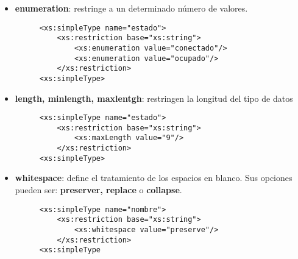 \begin{itemize}
    \item \textbf{enumeration}: restringe a un determinado número de valores.

    \begin{figure}[h]
        \begin{tcolorbox}[sharp corners, colback=yellow!30, colframe=white!20]
            \scriptsize
            \begin{verbatim}
<xs:simpleType name="estado">
    <xs:restriction base="xs:string">
        <xs:enumeration value="conectado"/>
        <xs:enumeration value="ocupado"/>
    </xs:restriction>
<xs:simpleType>
            \end{verbatim}
        \end{tcolorbox}
    \end{figure}

    \item \textbf{length, minlength, maxlentgh}: restringen la longitud del tipo de datos

    \begin{figure}[h]
        \begin{tcolorbox}[sharp corners, colback=yellow!30, colframe=white!20]
            \scriptsize
            \begin{verbatim}
<xs:simpleType name="estado">
    <xs:restriction base="xs:string">
        <xs:maxLength value="9"/>
    </xs:restriction>
<xs:simpleType>
            \end{verbatim}
        \end{tcolorbox}
    \end{figure}

    \item \textbf{whitespace}: define el tratamiento de los espacios en blanco. Sus opciones pueden ser: \textbf{preserver, replace} o \textbf{collapse}.

    \begin{figure}[h]
        \begin{tcolorbox}[sharp corners, colback=yellow!30, colframe=white!20]
            \scriptsize
            \begin{verbatim}
<xs:simpleType name="nombre">
    <xs:restriction base="xs:string">
        <xs:whitespace value="preserve"/>
    </xs:restriction>
<xs:simpleType
            \end{verbatim}
        \end{tcolorbox}
    \end{figure}


\end{itemize}
